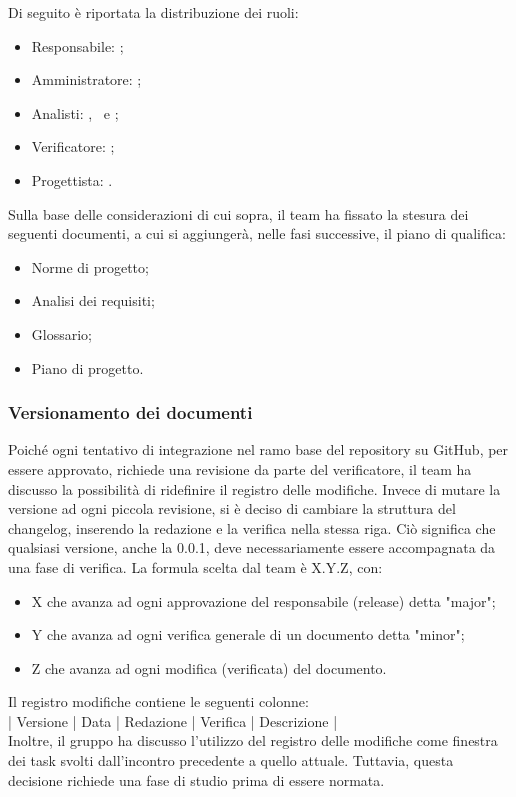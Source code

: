 \vspace{0.5\baselineskip}
Di seguito è riportata la distribuzione dei ruoli:
\begin{itemize}
	\item Responsabile: \riccardo;
	\item Amministratore: \tommaso;
	\item Analisti: \marco, \martina \ e \sebastiano;
	\item Verificatore: \raul;
	\item Progettista: \mattia.
\end{itemize}

\vspace{0.5\baselineskip}
Sulla base delle considerazioni di cui sopra, il team ha fissato la stesura dei seguenti documenti, a cui si aggiungerà, nelle fasi successive, il piano di qualifica:
\begin{itemize}
	\item Norme di progetto;
	\item Analisi dei requisiti;
	\item Glossario;
	\item Piano di progetto.
\end{itemize}

\subsubsection{Versionamento dei documenti} \label{versionamento}
Poiché ogni tentativo di integrazione nel ramo base del repository su GitHub, per essere approvato, richiede una revisione da parte del verificatore, il team ha discusso la possibilità di ridefinire il registro delle modifiche. Invece di mutare la versione ad ogni piccola revisione, si è deciso di cambiare la struttura del changelog, inserendo la redazione e la verifica nella stessa riga. Ciò significa che qualsiasi versione, anche la 0.0.1, deve necessariamente essere accompagnata da una fase di verifica. La formula scelta dal team è X.Y.Z, con:
\begin{itemize}
	\item X che avanza ad ogni approvazione del responsabile (release) detta "major";
	\item Y che avanza ad ogni verifica generale di un documento detta "minor";
	\item Z che avanza ad ogni modifica (verificata) del documento.
\end{itemize}

\vspace{0.5\baselineskip}
Il registro modifiche contiene le seguenti colonne: \\
\vspace{\baselineskip}
\hspace{1cm} | Versione | Data | Redazione | Verifica | Descrizione | \\
Inoltre, il gruppo ha discusso l'utilizzo del registro delle modifiche come finestra dei task svolti dall'incontro precedente a quello attuale. Tuttavia, questa decisione richiede una fase di studio prima di essere normata.

